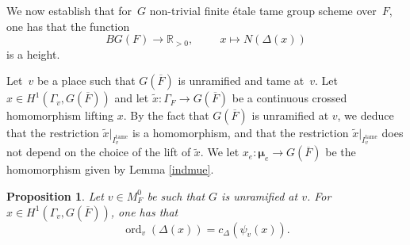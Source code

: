 \documentclass[a4paper,english,12pt]{amsart}
\newcommand{\RR}{\mathbb{R}}
\newcommand{\oF}{\overline F}
\newcommand{\vMFz}{v\in M_F ^0}
\newcommand{\muu}{\boldsymbol{\mu}}
\DeclareMathOperator{\ord}{ord}
\DeclareMathOperator{\tame}{{tame}}
\newtheorem{prop}[equation]{Proposition}
\numberwithin{equation}{subsection}
\begin{document}
\subsubsection{}\label{discofgtorsor} We now establish that for~$G$ non-trivial finite \' etale tame group scheme over~$F$, one has that the function $$BG(F)\to\RR_{>0},\hspace{1cm}x\mapsto N(\Delta(x))$$ is a height. 

Let~$v$ be a place such that $G(\overline F)$ is unramified and tame at~$v$. Let $x\in H^1(\Gamma_v, G(\overline F))$ and let $\widetilde x:\Gamma_F\to G(\overline F)$ be a continuous crossed homomorphism lifting $x$. By the fact that $G(\overline F)$ is unramified at $v$, we deduce that the restriction $\widetilde x|_{I_v^{\tame}}$ is a homomorphism, and that the restriction $\widetilde x|_{I_v^{\tame}}$ does not depend on the choice of the lift of $\widetilde x$. We let $x_e:\muu_e\to G(\overline F)$ be  the homomorphism given by Lemma \ref{indmue}.
\begin{prop}Let $\vMFz$ be such that $G$ is unramified at $v$. For $x\in H^1(\Gamma_v, G(\oF))$, one has that $$\ord_v(\Delta(x))=c_{\Delta}(\psi_v(x)).$$
\end{prop}
\end{document}
